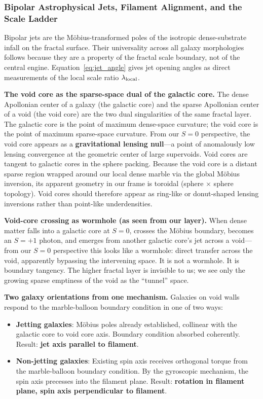 \documentclass[11pt,letterpaper]{article}
\begin{document}
\subsubsection{Bipolar Astrophysical Jets, Filament Alignment, and the Scale Ladder}
Bipolar jets are the M\"obius-transformed poles of the isotropic dense-substrate
infall on the fractal surface. Their universality across all galaxy morphologies
follows because they are a property of the fractal scale boundary, not of the
central engine. Equation~\eqref{eq:jet_angle} gives jet opening angles as direct
measurements of the local scale ratio $\lambda_{\rm local}$.


\textbf{The void core as the sparse-space dual of the galactic core.}
The dense Apollonian center of a galaxy (the galactic core) and the sparse
Apollonian center of a void (the void core) are the two dual singularities of the
same fractal layer. The galactic core is the point of maximum dense-space curvature;
the void core is the point of maximum sparse-space curvature. From our $S{=}0$
perspective, the void core appears as a \textbf{gravitational lensing null}---a
point of anomalously low lensing convergence at the geometric center of large
supervoids. Void cores are tangent to galactic cores in the sphere packing. Because
the void core is a distant sparse region wrapped around our local dense marble via
the global M\"obius inversion, its apparent geometry in our frame is toroidal
(sphere $\times$ sphere topology). Void cores should therefore appear as ring-like
or donut-shaped lensing inversions rather than point-like underdensities.

\textbf{Void-core crossing as wormhole (as seen from our layer).}
When dense matter falls into a galactic core at $S{=}0$, crosses the M\"obius
boundary, becomes an $S{=}+1$ photon, and emerges from another galactic core's jet
across a void---from our $S{=}0$ perspective this looks like a wormhole: direct
transfer across the void, apparently bypassing the intervening space. It is not a
wormhole. It is boundary tangency. The higher fractal layer is invisible to us; we
see only the growing sparse emptiness of the void as the ``tunnel'' space.

\textbf{Two galaxy orientations from one mechanism.} Galaxies on void walls
respond to the marble-balloon boundary condition in one of two ways:
\begin{itemize}
\item \textbf{Jetting galaxies}: M\"obius poles already established, collinear
    with the galactic core to void core axis. Boundary condition absorbed
    coherently. Result: \textbf{jet axis parallel to filament}.
\item \textbf{Non-jetting galaxies}: Existing spin axis receives orthogonal torque
    from the marble-balloon boundary condition. By the gyroscopic mechanism, the
    spin axis precesses into the filament plane.
    Result: \textbf{rotation in filament plane, spin axis perpendicular to filament}.
\end{itemize}
\end{document}

